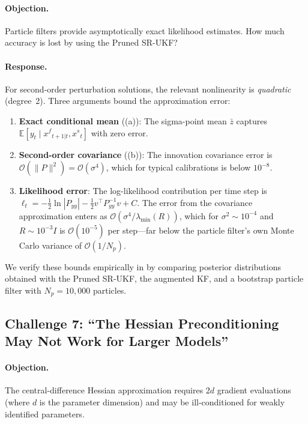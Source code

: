 \documentclass[12pt,a4paper]{article}
\newcommand{\E}{\mathbb{E}}
\newcommand{\xf}{{x^{f}}}
\newcommand{\xs}{{x^{s}}}
\newcommand{\cO}{\mathcal{O}}
\begin{document}
\paragraph{Objection.}
Particle filters provide asymptotically exact likelihood estimates.
How much accuracy is lost by using the Pruned SR-UKF?

\paragraph{Response.}
For second-order perturbation solutions, the relevant nonlinearity
is \emph{quadratic} (degree~2). Three arguments bound the
approximation error:

\begin{enumerate}[nosep]
\item \textbf{Exact conditional mean} ((a)): The
sigma-point mean $\bar{z}$ captures
$\E[y_t \mid \xf_{t+1|t}, \xs_t]$ with zero error.
\item \textbf{Second-order covariance} ((b)): The
innovation covariance error is $\cO(\|P\|^2) = \cO(\sigma^4)$, which
for typical calibrations is below $10^{-8}$.
\item \textbf{Likelihood error}: The log-likelihood contribution per
time step is
$\ell_t = -\tfrac{1}{2}\ln|P_{yy}| - \tfrac{1}{2}v^\top P_{yy}^{-1} v + C$.
The error from the covariance approximation enters as
$\cO(\sigma^4 / \lambda_{\min}(R))$, which for
$\sigma^2 \sim 10^{-4}$ and $R \sim 10^{-3} I$ is
$\cO(10^{-5})$ per step---far below the particle filter's own
Monte Carlo variance of $\cO(1/N_p)$.
\end{enumerate}

We verify these bounds empirically in  by
comparing posterior distributions obtained with the Pruned SR-UKF,
the augmented KF, and a bootstrap particle filter with
$N_p = 10{,}000$ particles.

\subsection{Challenge 7: ``The Hessian Preconditioning May Not Work for Larger Models''}
\label{sec:challenge-hessian}

\paragraph{Objection.}
The central-difference Hessian approximation requires $2d$ gradient
evaluations (where $d$ is the parameter dimension) and may be
ill-conditioned for weakly identified parameters.
\end{document}
